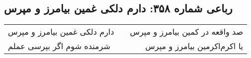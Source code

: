\begin{center}
\section*{رباعی شماره ۳۵۸: دارم دلکی غمین بیامرز و مپرس}
\label{sec:sh358}
\begin{longtable}{l p{0.5cm} r}
دارم دلکی غمین بیامرز و مپرس
&&
صد واقعه در کمین بیامرز و مپرس
\\
شرمنده شوم اگر بپرسی عملم
&&
یا اکرم‌اکرمین بیامرز و مپرس
\\
\end{longtable}
\end{center}
